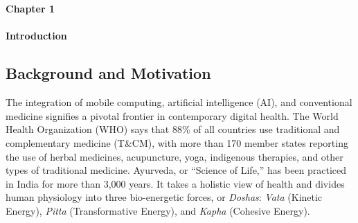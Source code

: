
\titleformat{\chapter}[block]{\normalfont}{}{0pt}{}
\titlespacing{\chapter}{0pt}{-2em}{0pt}
\chapter[Introduction]{}
\thispagestyle{fancy}
\vspace*{\fill}
\begin{center}
\textbf{\Huge{Chapter 1}}\\\\
\vspace{5mm}
\textbf{\Huge{Introduction}}
\end{center}
\vspace*{\fill}
\newpage

\titleformat{\chapter}[display]{\vspace{1cm}\normalfont\Large\bfseries\centering}{\chaptertitlename\ \thechapter}{20pt}{\vspace{0pt}}
\titlespacing*{\chapter}{0pt}{-50pt}{20pt}

\section{Background and Motivation}
\justify
The integration of mobile computing, artificial intelligence (AI), and conventional medicine signifies a pivotal frontier in contemporary digital health. The World Health Organization (WHO) says that 88\% of all countries use traditional and complementary medicine (T\&CM), with more than 170 member states reporting the use of herbal medicines, acupuncture, yoga, indigenous therapies, and other types of traditional medicine. Ayurveda, or ``Science of Life,'' has been practiced in India for more than 3,000 years. It takes a holistic view of health and divides human physiology into three bio-energetic forces, or \textit{Doshas}: \textit{Vata} (Kinetic Energy), \textit{Pitta} (Transformative Energy), and \textit{Kapha} (Cohesive Energy).

